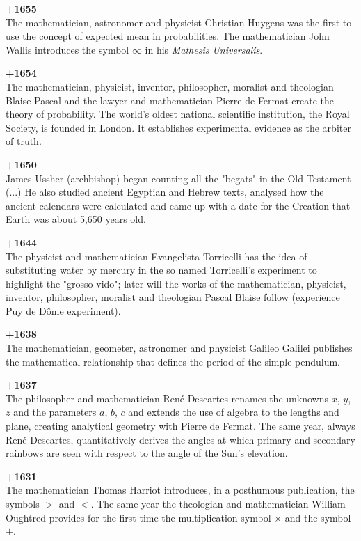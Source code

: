 \textbf{+1655}\\
The mathematician, astronomer and physicist Christian Huygens was the first to use the concept of expected mean in probabilities. The mathematician John Wallis introduces the symbol $\infty$ in his \textit{Mathesis Universalis}.

\textbf{+1654}\\
The mathematician, physicist, inventor, philosopher, moralist and theologian Blaise Pascal and the lawyer and mathematician Pierre de Fermat create the theory of probability. The world's oldest national scientific institution, the Royal Society, is founded in London. It establishes experimental evidence as the arbiter of truth.

\textbf{+1650}\\
James Ussher (archbishop) began counting all the "begats" in the Old Testament (...) He also studied ancient Egyptian and Hebrew texts, analysed how the ancient calendars were calculated and came up with a date for the Creation that Earth was about 5,650 years old.

\textbf{+1644}\\
The physicist and mathematician Evangelista Torricelli has the idea of substituting water by mercury in the so named Torricelli's experiment to highlight the "grosso-vido"; later will the works of the mathematician, physicist, inventor, philosopher, moralist and theologian Pascal Blaise follow (experience Puy de Dôme experiment).

\textbf{+1638}\\
The mathematician, geometer, astronomer and physicist Galileo Galilei publishes the mathematical relationship that defines the period of the simple pendulum.

\textbf{+1637}\\
The philosopher and mathematician René Descartes renames the unknowns $x$, $y$, $z$ and the parameters $a$, $b$, $c$ and extends the use of algebra to the lengths and plane, creating analytical geometry with Pierre de Fermat. The same year, always René Descartes, quantitatively derives the angles at which primary and secondary rainbows are seen with respect to the angle of the Sun's elevation.

\textbf{+1631}\\
The mathematician Thomas Harriot introduces, in a posthumous publication, the symbols $>$ and $<$. The same year the theologian and mathematician William Oughtred provides for the first time the multiplication symbol $\times$ and the symbol $\pm$.

